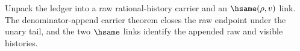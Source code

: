 Unpack the ledger into a raw rational-history carrier and an $\hsame(\rho,v)$
link. The denominator-append carrier theorem closes the raw endpoint under the
unary tail, and the two $\hsame$ links identify the appended raw and visible
histories.
